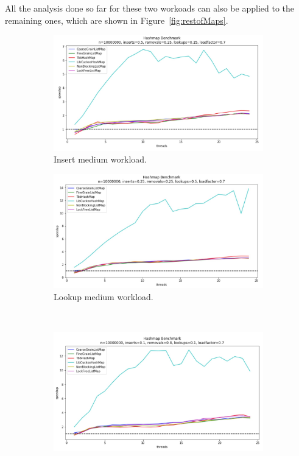 \documentclass[11pt]{article}
\begin{document}
All the analysis done so far for these two workoads can also be applied to the remaining ones,
which are shown in Figure~\ref{fig:restofMaps}.

\begin{figure}[h]
\begin{subfigure}{.5\textwidth}
  \centering
  \includegraphics[width=1.0\linewidth]{figs/patricio/latedays/inserts_medium.jpg}
  \caption{Insert medium workload.}
  \label{fig:mapInsertMedium}
\end{subfigure}%
\hspace*{\fill}
\begin{subfigure}{.5\textwidth}
  \centering
  \includegraphics[width=1.0\linewidth]{figs/patricio/latedays/lookups_medium.jpg}
  \caption{Lookup medium workload.}
  \label{fig:mapLookupMedium}
\end{subfigure}
\\ %
\begin{subfigure}{0.5\textwidth}
  \centering
  \includegraphics[width=1.0\linewidth]{figs/patricio/latedays/removals_heavy.jpg}

\end{subfigure}
\end{figure}
\end{document}

